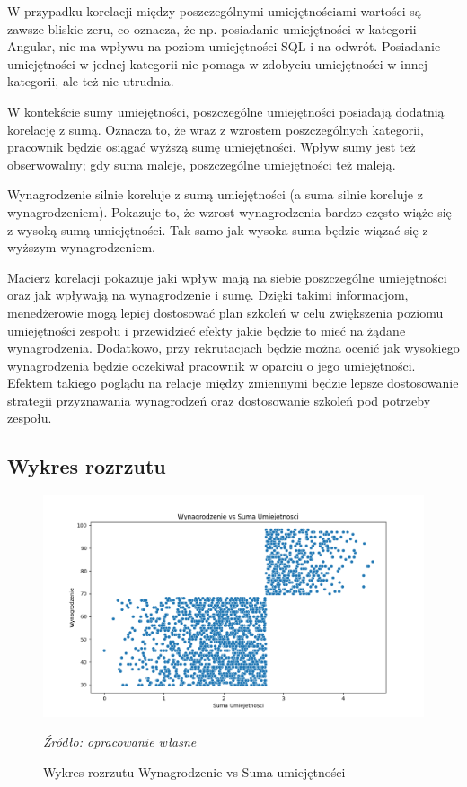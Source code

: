     \par W przypadku korelacji między poszczególnymi umiejętnościami wartości są zawsze bliskie zeru, co oznacza, że np. posiadanie umiejętności w kategorii Angular, nie ma wpływu na poziom umiejętności SQL i na odwrót. Posiadanie umiejętności w jednej kategorii nie pomaga w zdobyciu umiejętności w innej kategorii, ale też nie utrudnia. 
    
    \par W kontekście sumy umiejętności, poszczególne umiejętności posiadają dodatnią korelację z sumą. Oznacza to, że wraz z wzrostem poszczególnych kategorii, pracownik będzie osiągać wyższą sumę umiejętności. Wpływ sumy jest też obserwowalny; gdy suma maleje, poszczególne umiejętności też maleją.

    \par Wynagrodzenie silnie koreluje z sumą umiejętności (a suma silnie koreluje z wynagrodzeniem). Pokazuje to, że wzrost wynagrodzenia bardzo często wiąże się z wysoką sumą umiejętności. Tak samo jak wysoka suma będzie wiązać się z wyższym wynagrodzeniem.

    \par Macierz korelacji pokazuje jaki wpływ mają na siebie poszczególne umiejętności oraz jak wpływają na wynagrodzenie i sumę. Dzięki takimi informacjom, menedżerowie mogą lepiej dostosować plan szkoleń w celu zwiększenia poziomu umiejętności zespołu i przewidzieć efekty jakie będzie to mieć na żądane wynagrodzenia. Dodatkowo, przy rekrutacjach będzie można ocenić jak wysokiego wynagrodzenia będzie oczekiwał pracownik w oparciu o jego umiejętności. Efektem takiego poglądu na relacje między zmiennymi będzie lepsze dostosowanie strategii przyznawania wynagrodzeń oraz dostosowanie szkoleń pod potrzeby zespołu. 
    
    \subsection{Wykres rozrzutu}\label{subsec:scatter}
    \begin{figure}[H]
        \centering
        \includegraphics[width=\linewidth]{chapters/Images/rozrzut.png}
        \cprotect\caption{Wykres rozrzutu Wynagrodzenie vs Suma umiejętności}
        \textit{Źródło: opracowanie własne} 
        \label{fig:scatter_plot}
    \end{figure}

